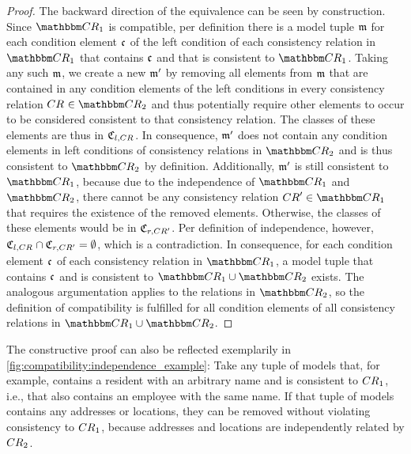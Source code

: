 \begin{proof}
    The backward direction of the equivalence can be seen by construction.
    Since $\consistencyrelationset{CR}_{1}$ is compatible, per definition there is a model tuple $\modeltuple{m}$ for each condition element $\conditionelement{c}{}$ of the left condition of each consistency relation in $\consistencyrelationset{CR}_{1}$ that contains $\conditionelement{c}{}$ and that is consistent to $\consistencyrelationset{CR}_{1}$.
    Taking any such $\modeltuple{m}$, we create a new $\modeltuple{m'}$ by removing all elements from $\modeltuple{m}$ that are contained in any condition elements of the left conditions in every consistency relation $\consistencyrelation{CR}{} \in \consistencyrelationset{CR}_{2}$ and thus potentially require other elements to occur to be considered consistent to that consistency relation.
    The classes of these elements are thus in $\classtuple{C}{l,\consistencyrelation{CR}{}}$.
    In consequence, $\modeltuple{m'}$ does not contain any condition elements in left conditions of consistency relations in $\consistencyrelationset{CR}_{2}$ and is thus consistent to $\consistencyrelationset{CR}_{2}$ by definition. 
    Additionally, $\modeltuple{m'}$ is still consistent to $\consistencyrelationset{CR}_{1}$, because due to the independence of $\consistencyrelationset{CR}_{1}$ and $\consistencyrelationset{CR}_{2}$, there cannot be any consistency relation $\consistencyrelation{CR}{}' \in \consistencyrelationset{CR}_{1}$ that requires the existence of the removed elements.
    Otherwise, the classes of these elements would be in $\classtuple{C}{r,\consistencyrelation{CR}{}'}$.
    Per definition of independence, however, $\classtuple{C}{l,\consistencyrelation{CR}{}} \cap \classtuple{C}{r,\consistencyrelation{CR}{}'} = \emptyset$, which is a contradiction.
    In consequence, for each condition element $\conditionelement{c}{}$ of each consistency relation in $\consistencyrelationset{CR}_{1}$, a model tuple that contains $\conditionelement{c}{}$ and is consistent to $\consistencyrelationset{CR}_{1} \cup \consistencyrelationset{CR}_{2}$ exists.
    The analogous argumentation applies to the relations in $\consistencyrelationset{CR}_{2}$, so the definition of compatibility is fulfilled for all condition elements of all consistency relations in $\consistencyrelationset{CR}_{1} \cup \consistencyrelationset{CR}_{2}$.
\end{proof}

The constructive proof can also be reflected exemplarily in \autoref{fig:compatibility:independence_example}: Take any tuple of models that, for example, contains a resident with an arbitrary name and is consistent to $\consistencyrelation{CR}{1}$, i.e., that also contains an employee with the same name.
If that tuple of models contains any addresses or locations, they can be removed without violating consistency to $\consistencyrelation{CR}{1}$, because addresses and locations are independently related by $\consistencyrelation{CR}{2}$.


